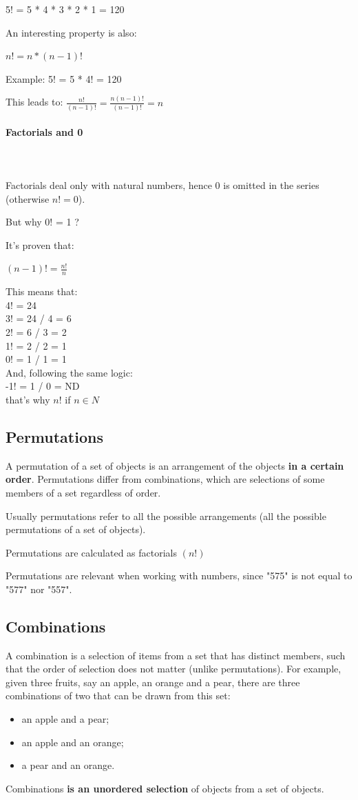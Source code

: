 \documentclass{article}
\begin{document}
5! = 5 * 4 * 3 * 2 * 1 = 120

An interesting property is also:

$n! = n * (n-1)!$

Example:
5! = 5 * 4! = 120

This leads to:
$\frac{n!}{(n-1)!} = \frac{n(n-1)!}{(n-1)!} = n$

\paragraph{Factorials and 0}\mbox{} \\
\mbox{} \\
Factorials deal only with natural numbers, hence 0 is omitted in the series (otherwise $n! = 0$).

But why 0! = 1 ?

It’s proven that:

$(n-1)! = \frac{n!}{n}$

This means that: \\
4! = 24 \\
3! = 24 / 4 = 6 \\
2! = 6 / 3 = 2 \\
1! = 2 / 2 = 1 \\
0! = 1 / 1 = 1 \\

And, following the same logic: \\
-1! = 1 / 0 = ND \\

that’s why $n!$ if $n \in {N} $ 

\subsection{Permutations}
A permutation of a set of objects is an arrangement of the objects \textbf{in a certain order}. 
Permutations differ from combinations, which are selections of some members of a set regardless of order. 

Usually permutations refer to all the possible arrangements (all the possible permutations of a set of objects). 

Permutations are calculated as factorials $(n!)$

Permutations are relevant when working with numbers, since "575" is not equal to "577" nor "557".

\subsection{Combinations}
A combination is a selection of items from a set that has distinct members, such that the order of selection does not matter (unlike permutations). 
For example, given three fruits, say an apple, an orange and a pear, there are three combinations of two that can be drawn from this set: 
\begin{itemize}
    \item an apple and a pear;
    \item an apple and an orange;
    \item a pear and an orange.
\end{itemize} 
Combinations \textbf{is an unordered selection} of objects from a set of objects.
\end{document}
